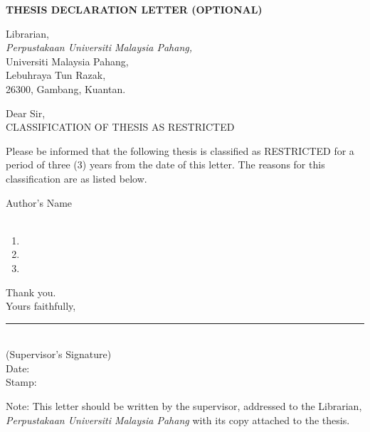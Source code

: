 \thispagestyle{empty}

\begin{center}
	\textbf{THESIS DECLARATION LETTER (OPTIONAL)}\\
	\vspace{0.5cm}
\end{center}

\begin{onehalfspacing}
\begin{flushleft}

Librarian,\\
\textit{Perpustakaan Universiti Malaysia Pahang,}\\
Universiti Malaysia Pahang,\\
Lebuhraya Tun Razak,\\
26300, Gambang, Kuantan.
\vspace{0.5cm}

Dear Sir,\\
\vspace{0.5cm}
CLASSIFICATION OF THESIS AS RESTRICTED\\
\end{flushleft}

\noindent
Please be informed that the following thesis is classified as RESTRICTED for a period of three (3) years from the date of this letter. The reasons for this classification are as listed below.

Author's Name\\
\\

\newenvironment{Reasons}
    {\text{Reasons:}\begin{minipage}[t]{0.8\linewidth}\begin{enumerate}[leftmargin=-.4in]}
    {\end{enumerate}\end{minipage}}

\begin{Reasons}
\vspace{6pt}
\item 
\item 
\item 
\end{Reasons}

\begin{flushleft}
Thank you.\\

Yours faithfully,\\
\vspace{2cm}
\noindent\rule{5cm}{0.4pt}\\
(Supervisor's Signature)\\

Date:\\
Stamp:\\

\end{flushleft}
Note: This letter should be written by the supervisor, addressed to the Librarian, \textit{Perpustakaan Universiti Malaysia Pahang} with its copy attached to the thesis.
\end{onehalfspacing}